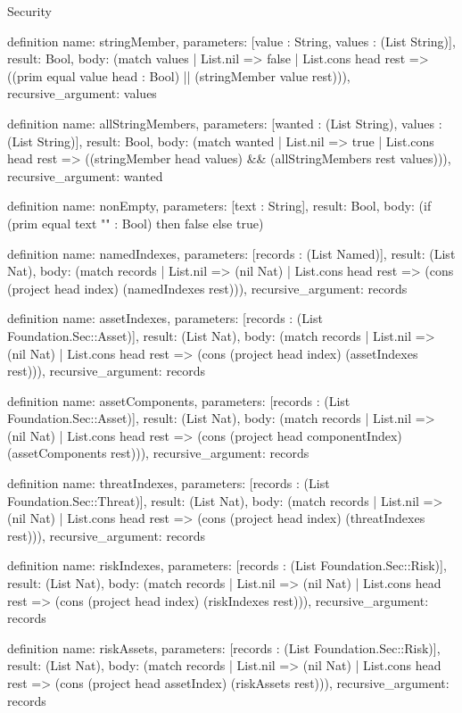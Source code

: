 \begin{lexlean}{Security}
\begin{semanticmodule}
definition{
  name: stringMember,
  parameters: [value : String, values : (List String)],
  result: Bool,
  body: (match values
    | List.nil => false
    | List.cons head rest => ((prim equal value head : Bool) || (stringMember value rest))),
  recursive_argument: values
}

definition{
  name: allStringMembers,
  parameters: [wanted : (List String), values : (List String)],
  result: Bool,
  body: (match wanted
    | List.nil => true
    | List.cons head rest => ((stringMember head values) && (allStringMembers rest values))),
  recursive_argument: wanted
}

definition{
  name: nonEmpty,
  parameters: [text : String],
  result: Bool,
  body: (if (prim equal text "" : Bool) then false else true)
}

definition{
  name: namedIndexes,
  parameters: [records : (List Named)],
  result: (List Nat),
  body: (match records
    | List.nil => (nil Nat)
    | List.cons head rest => (cons (project head index) (namedIndexes rest))),
  recursive_argument: records
}

definition{
  name: assetIndexes,
  parameters: [records : (List Foundation.Sec::Asset)],
  result: (List Nat),
  body: (match records
    | List.nil => (nil Nat)
    | List.cons head rest => (cons (project head index) (assetIndexes rest))),
  recursive_argument: records
}

definition{
  name: assetComponents,
  parameters: [records : (List Foundation.Sec::Asset)],
  result: (List Nat),
  body: (match records
    | List.nil => (nil Nat)
    | List.cons head rest => (cons (project head componentIndex) (assetComponents rest))),
  recursive_argument: records
}

definition{
  name: threatIndexes,
  parameters: [records : (List Foundation.Sec::Threat)],
  result: (List Nat),
  body: (match records
    | List.nil => (nil Nat)
    | List.cons head rest => (cons (project head index) (threatIndexes rest))),
  recursive_argument: records
}

definition{
  name: riskIndexes,
  parameters: [records : (List Foundation.Sec::Risk)],
  result: (List Nat),
  body: (match records
    | List.nil => (nil Nat)
    | List.cons head rest => (cons (project head index) (riskIndexes rest))),
  recursive_argument: records
}

definition{
  name: riskAssets,
  parameters: [records : (List Foundation.Sec::Risk)],
  result: (List Nat),
  body: (match records
    | List.nil => (nil Nat)
    | List.cons head rest => (cons (project head assetIndex) (riskAssets rest))),
  recursive_argument: records
}


\end{semanticmodule}
\end{lexlean}
